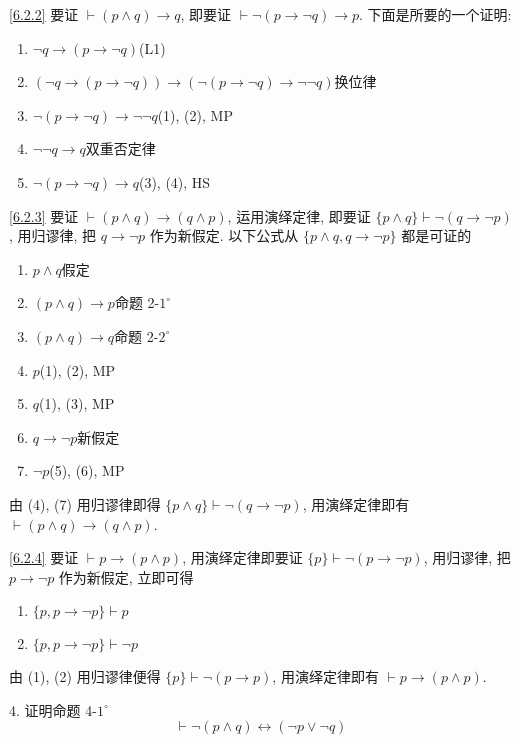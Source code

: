 \documentclass[boxes]{homework}
\begin{document}
\begin{solution}
    \ref{6.2.2} 要证 $\vdash (p\land q)\to q$, 即要证 $\vdash \lnot (p\to \lnot q)\to p$. 下面是所要的一个证明:
    \begin{enumerate}[label = (\arabic*), itemsep = 0em, topsep = .5em, partopsep = .5em]
        \item $\lnot q\to (p\to \lnot q)$\hfill (L1)
        \item $(\lnot q\to (p\to \lnot q))\to (\lnot (p\to \lnot q)\to \lnot \lnot q)$\hfill 换位律
        \item $\lnot (p\to \lnot q)\to \lnot \lnot q$\hfill (1), (2), MP
        \item $\lnot\lnot q\to q$\hfill 双重否定律
        \item $\lnot (p\to \lnot q)\to q$\hfill (3), (4), HS
    \end{enumerate}

    \ref{6.2.3} 要证 $\vdash (p\land q)\to (q\land p)$, 运用演绎定律, 即要证 $\{p\land q\}\vdash \lnot(q\to\lnot p)$, 用归谬律, 把 $q\to\lnot p$ 作为新假定.
    以下公式从 $\{p\land q, q\to \lnot p\}$ 都是可证的
    \begin{enumerate}[label = (\arabic*), itemsep = 0em, topsep = .5em, partopsep = .5em]
        \item $p\land q$\hfill 假定
        \item $(p\land q)\to p$\hfill 命题 2-$1^\circ$
        \item $(p\land q)\to q$\hfill 命题 2-$2^\circ$
        \item $p$\hfill (1), (2), MP
        \item $q$\hfill (1), (3), MP
        \item $q\to\lnot p$\hfill 新假定
        \item $\lnot p$\hfill (5), (6), MP
    \end{enumerate}
    由 (4), (7) 用归谬律即得 $\{p\land q\}\vdash \lnot(q\to\lnot p)$, 用演绎定律即有 $\vdash (p\land q)\to (q\land p)$.

    \ref{6.2.4} 要证 $\vdash p\to(p\land p)$, 用演绎定律即要证 $\{p\}\vdash \lnot (p\to \lnot p)$, 用归谬律, 把 $p\to\lnot p$ 作为新假定, 立即可得
    \begin{enumerate}[label = (\arabic*), itemsep = 0em, topsep = .5em, partopsep = .5em]
        \item $\{p, p\to \lnot p\}\vdash p$
        \item $\{p, p\to \lnot p\}\vdash \lnot p$
    \end{enumerate}
    由 (1), (2) 用归谬律便得 $\{p\}\vdash\lnot (p\to p)$, 用演绎定律即有 $\vdash p\to (p\land p)$.
\end{solution}
\begin{problem}
4. 证明命题 4-$1^\circ$
$$
    \vdash \lnot (p\land q) \leftrightarrow (\lnot p\lor \lnot q)
$$
\end{problem}
\end{document}
